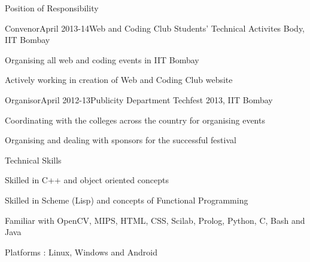 \documentclass{resume} %
\begin{document}
\begin{rSection}{Position of Responsibility}

\begin{rSubsection}{Convenor}{April 2013-14}{Web and Coding Club }{Students' Technical Activites Body, IIT Bombay}
\item Organising all web and coding events in IIT Bombay
\item Actively working in creation of Web and Coding Club website
\end{rSubsection}


\begin{rSubsection}{Organisor}{April 2012-13}{Publicity Department}{ Techfest 2013, IIT Bombay}
\item Coordinating with the colleges across the country for organising events
\item Organising and dealing with sponsors for the successful festival
\end{rSubsection}

\end{rSection}


\begin{rSection}{Technical Skills}

\begin{rSubsection}{}{}{}{}
\item Skilled in C++ and object oriented concepts
\item Skilled in Scheme (Lisp) and concepts of Functional Programming
\item Familiar with OpenCV, MIPS, HTML, CSS, Scilab, Prolog, Python, C, Bash and Java
\item Platforms : Linux, Windows and Android
\end{rSubsection}

\end{rSection}

\end{document}
